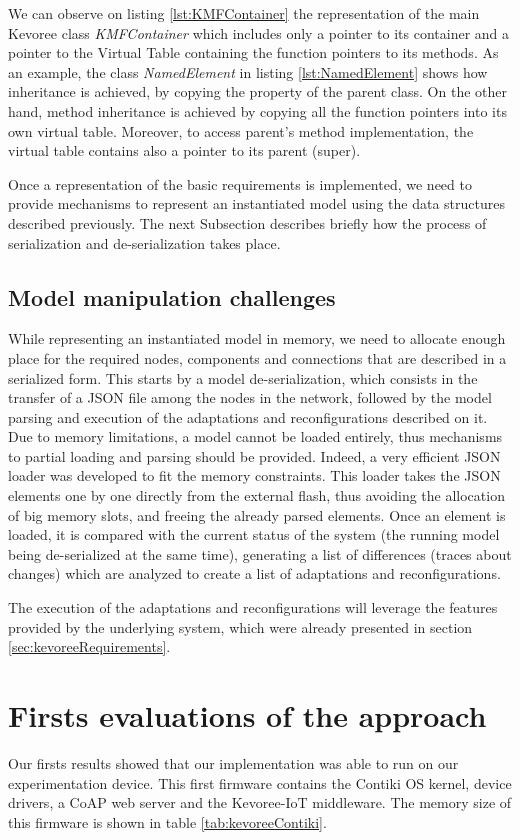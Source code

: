 We can observe on listing \ref{lst:KMFContainer} the representation of the main Kevoree class \textit{KMFContainer} which includes only a pointer to its container and a pointer to the Virtual Table containing the function pointers to its methods.
As an example, the class \textit{NamedElement} in listing \ref{lst:NamedElement} shows how inheritance is achieved, by copying the property of the parent class.
On the other hand, method inheritance is achieved by copying all the function pointers into its own virtual table. 
Moreover, to access parent's method implementation, the virtual table contains also a pointer to its parent (super).

Once a representation of the basic requirements is implemented, we need to provide mechanisms to represent an instantiated model using the data structures described previously.
The next Subsection describes briefly how the process of serialization and de-serialization takes place.

\subsection{Model manipulation challenges}
While representing an instantiated model in memory, we need to allocate enough place for the required nodes, components and connections that are described in a serialized form.
This starts by a model de-serialization, which consists in the transfer of a JSON file among the nodes in the network, followed by the model parsing and execution of the adaptations and reconfigurations described on it.
Due to memory limitations, a model cannot be loaded entirely, thus mechanisms to partial loading and parsing should be provided.
Indeed, a very efficient JSON loader was developed to fit the memory constraints.
This loader takes the JSON elements one by one directly from the external flash, thus avoiding the allocation of big memory slots, and freeing the already parsed elements.
Once an element is loaded, it is compared with the current status of the system (the running model being de-serialized at the same time), generating a list of differences (traces about changes) which are analyzed to create a list of adaptations and reconfigurations.

The execution of the adaptations and reconfigurations will leverage the features provided by the underlying system, which were already presented in section \ref{sec:kevoreeRequirements}.

\section{Firsts evaluations of the approach}
Our firsts results showed that our implementation was able to run on our experimentation device.
This first firmware contains the Contiki OS kernel, device drivers, a CoAP web server and the Kevoree-IoT middleware.
The memory size of this firmware is shown in table \ref{tab:kevoreeContiki}.

